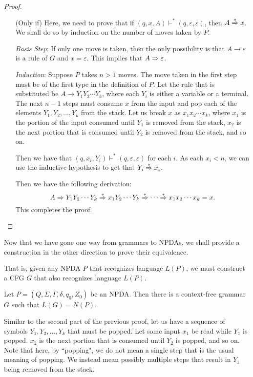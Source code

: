 \begin{proof}
\begin{itemize}
        \item[(Only if)] Here, we need to prove that if $(q,x,A)\vdash^*(q,\varepsilon,\varepsilon)$, then $A\overset{*}{\Rightarrow} x$. We shall do so by induction on the number of moves taken by $P$. 
        
        \vspace{2mm}
        \textit{Basis Step}: If only one move is taken, then the only possibility is that $A\to\varepsilon$ is a rule of $G$ and $x=\varepsilon$. This implies that $A\Rightarrow \varepsilon$.
        
        \vspace{1mm}
        \textit{Induction}: Suppose $P$ takes $n>1$ moves. The move taken in the first step must be of the first type in the definition of $P$. Let the rule that is substituted be $A\to Y_1Y_2\cdots Y_k$, where each $Y_i$ is either a variable or a terminal. The next $n-1$ steps must consume $x$ from the input and pop each of the elements $Y_1,Y_2,\ldots,Y_k$ from the stack. Let us break $x$ as $x_1x_2\cdots x_k$, where $x_1$ is the portion of the input consumed until $Y_1$ is removed from the stack, $x_2$ is the next portion that is consumed until $Y_2$ is removed from the stack, and so on.
        
        Then we have that $(q, x_i, Y_i) \vdash^* (q, \varepsilon, \varepsilon)$ for each $i$. As each $x_i<n$, we can use the inductive hypothesis to get that $Y_i\overset{*}{\Rightarrow} x_i$.
        
        Then we have the following derivation:
        $$A\Rightarrow Y_1Y_2\cdots Y_k\overset{*}{\Rightarrow} x_1Y_2\cdots Y_k\overset{*}{\Rightarrow}\cdots\overset{*}{\Rightarrow} x_1x_2\cdots x_k = x.$$
        This completes the proof.
    \end{itemize}
\end{proof}

Now that we have gone one way from grammars to NPDAs, we shall provide a construction in the other direction to prove their equivalence.

That is, given any NPDA $P$ that recognizes language $L(P)$, we must construct a CFG $G$ that also recognizes language $L(P)$. 

\begin{lemma}
\label{NPDAtoCFGequivalence}
    Let $P=(Q,\Sigma,\Gamma,\delta,q_0,Z_0)$ be an NPDA. Then there is a context-free grammar $G$ such that $L(G)=N(P)$.
\end{lemma}

Similar to the second part of the previous proof, let us have a sequence of symbols $Y_1,Y_2,\ldots,Y_k$ that must be popped. Let some input $x_1$ be read while $Y_1$ is popped. $x_2$ is the next portion that is consumed until $Y_2$ is popped, and so on. Note that here, by ``popping", we do not mean a single step that is the usual meaning of popping. We instead mean possibly multiple steps that result in $Y_1$ being removed from the stack.

